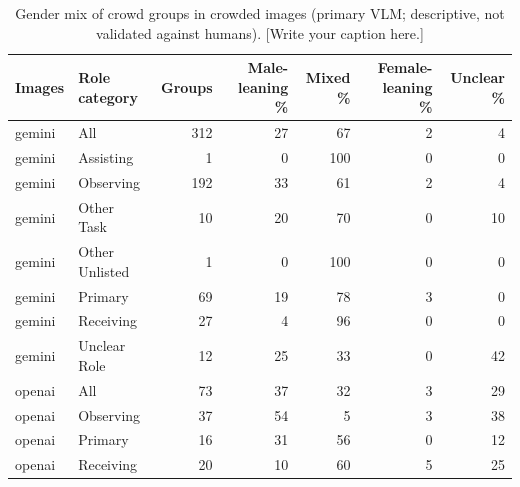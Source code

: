 \begin{table}[t]
\centering
\scriptsize
\begin{tabular}{@{}llrrrrr@{}}
\toprule
Images & Role category & Groups & Male-leaning \% & Mixed \% & Female-leaning \% & Unclear \% \\
\midrule
gemini & All & 312 & 27 & 67 & 2 & 4 \\
gemini & Assisting & 1 & 0 & 100 & 0 & 0 \\
gemini & Observing & 192 & 33 & 61 & 2 & 4 \\
gemini & Other Task & 10 & 20 & 70 & 0 & 10 \\
gemini & Other Unlisted & 1 & 0 & 100 & 0 & 0 \\
gemini & Primary & 69 & 19 & 78 & 3 & 0 \\
gemini & Receiving & 27 & 4 & 96 & 0 & 0 \\
gemini & Unclear Role & 12 & 25 & 33 & 0 & 42 \\
openai & All & 73 & 37 & 32 & 3 & 29 \\
openai & Observing & 37 & 54 & 5 & 3 & 38 \\
openai & Primary & 16 & 31 & 56 & 0 & 12 \\
openai & Receiving & 20 & 10 & 60 & 5 & 25 \\
\bottomrule
\end{tabular}
\caption{Gender mix of crowd groups in crowded images (primary VLM; descriptive, not validated against humans). [Write your caption here.]}
\label{tab:crowd-mix}
\end{table}
